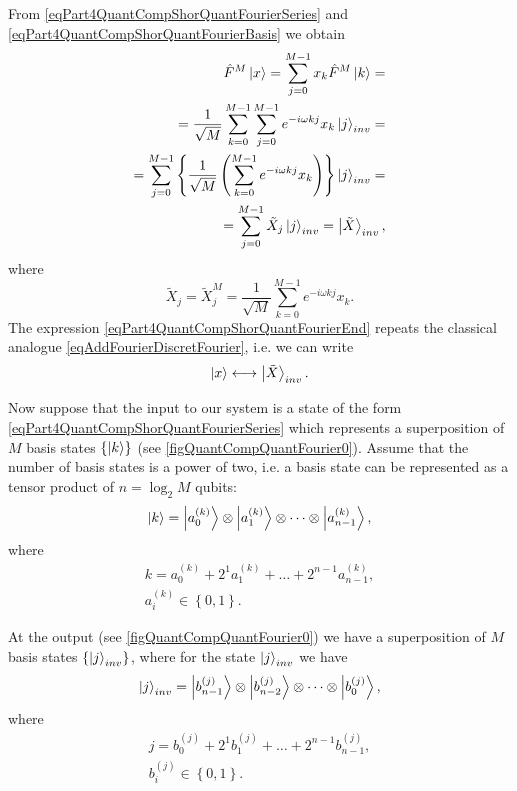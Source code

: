 From \eqref{eqPart4QuantCompShorQuantFourierSeries} and
\eqref{eqPart4QuantCompShorQuantFourierBasis} we obtain
\begin{eqnarray}
\hat{F}^{M}\ket{x} = \sum_{j = 0}^{M - 1}x_k \hat{F}^{M}
\ket{k} = 
\nonumber \\
= \frac{1}{\sqrt{M}}\sum_{k = 0}^{M -1}\sum_{j = 0}^{M - 1}
e^{-i \omega k j}x_k\ket{j}_{inv} = 
\nonumber \\
= \sum_{j = 0}^{M - 1} \left\{\frac{1}{\sqrt{M}}\left(
\sum_{k = 0}^{M - 1}e^{-i \omega k j} x_k
\right)\right\}\ket{j}_{inv} = 
\nonumber \\
= \sum_{j = 0}^{M - 1}\tilde{X}_j\ket{j}_{inv} = \left|\tilde{X}\right>_{inv},
\nonumber
\end{eqnarray}
where 
\begin{equation}
\tilde{X}_j = \tilde{X}_j^{M} = 
\frac{1}{\sqrt{M}}\sum_{k = 0}^{M - 1}e^{-i \omega k j} x_k.
\label{eqPart4QuantCompShorQuantFourierEnd}
\end{equation}
The expression \eqref{eqPart4QuantCompShorQuantFourierEnd} repeats
the classical analogue \eqref{eqAddFourierDiscretFourier}, i.e. we can write
\[
 \ket{x} \longleftrightarrow \left|\tilde{X}\right>_{inv}.
\]



Now suppose that the input to our system is a state of the form
\eqref{eqPart4QuantCompShorQuantFourierSeries} which represents
a superposition of $M$ basis states
$\left\{\ket{k}\right\}$ 
(see \autoref{figQuantCompQuantFourier0}). 
Assume that the number of basis
states is a power of two, i.e. a basis state
can be represented as a tensor product of $n = \log_2{M}$ qubits:
\begin{equation}
\ket{k} = \ket{a^{(k)}_0} \otimes  \ket{a^{(k)}_1}
\otimes \cdots \otimes \ket{a^{(k)}_{n-1}}, 
\nonumber
\end{equation}
where
\begin{eqnarray}
k = a^{(k)}_0 + 2^1 a^{(k)}_1 + \dots + 2^{n-1} a^{(k)}_{n-1},
\nonumber \\
a^{(k)}_i \in \left\{0, 1\right\}.
\nonumber
\end{eqnarray}

At the output
(see \autoref{figQuantCompQuantFourier0})
we have a superposition of $M$ basis states
$\left\{\ket{j}_{inv}\right\}$, where for the state
$\ket{j}_{inv}$ we have 
\begin{equation}
\ket{j}_{inv} = \ket{b^{(j)}_{n-1}} \otimes
\ket{b^{(j)}_{n-2}} 
\otimes \cdots \otimes \ket{b^{(j)}_{0}}, 
\nonumber
\end{equation}
where
\begin{eqnarray}
j = b^{(j)}_0 + 2^1 b^{(j)}_1 + \dots + 2^{n-1} b^{(j)}_{n-1},
\nonumber \\
b^{(j)}_i \in \left\{0, 1\right\}.
\nonumber
\end{eqnarray}

